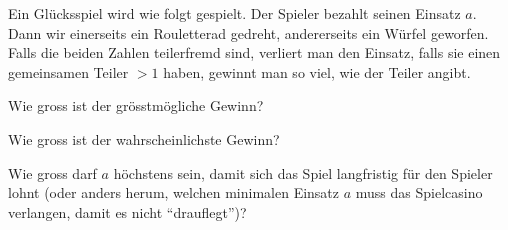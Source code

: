 Ein Glücksspiel wird wie folgt gespielt. Der Spieler bezahlt seinen
Einsatz $a$. Dann wir einerseits ein
Rouletterad gedreht, andererseits ein Würfel geworfen. Falls
die beiden Zahlen teilerfremd sind, verliert man den Einsatz, falls
sie einen gemeinsamen Teiler $>1$ haben, gewinnt man so viel, wie
der Teiler angibt.
\begin{teilaufgaben}
\item Wie gross ist der grösstmögliche Gewinn?
\item Wie gross ist der wahrscheinlichste Gewinn?
\item Wie gross darf $a$ höchstens sein, damit sich das Spiel langfristig
für den Spieler lohnt (oder anders herum, welchen minimalen Einsatz $a$
muss das Spielcasino verlangen, damit es nicht ``drauflegt'')?
\end{teilaufgaben}

